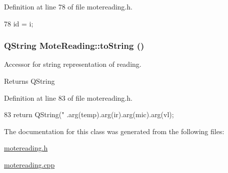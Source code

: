 Definition at line 78 of file motereading.h.




\begin{DoxyCode}
78 { id = i; }
\end{DoxyCode}


\hypertarget{classMoteReading_a5e60715c001c14f3e3f4cff6f886f0ad}{
\subsubsection[{toString}]{\setlength{\rightskip}{0pt plus 5cm}QString MoteReading::toString ()}}
\label{classMoteReading_a5e60715c001c14f3e3f4cff6f886f0ad}


Accessor for string representation of reading. 

\begin{DoxyReturn}{Returns}
QString 
\end{DoxyReturn}


Definition at line 83 of file motereading.h.




\begin{DoxyCode}
83 { return QString("%
      .arg(temp).arg(ir).arg(mic).arg(vl); }
\end{DoxyCode}




The documentation for this class was generated from the following files:\begin{DoxyCompactItemize}
\item 
\hyperlink{motereading_8h}{motereading.h}\item 
\hyperlink{motereading_8cpp}{motereading.cpp}\end{DoxyCompactItemize}
